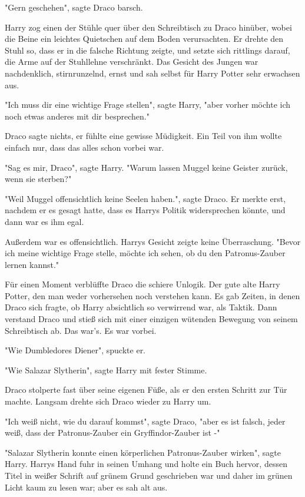 {"Gern geschehen", sagte Draco barsch.

Harry zog einen der Stühle quer über den Schreibtisch zu Draco hinüber, wobei die Beine ein leichtes Quietschen auf dem Boden verursachten. Er drehte den Stuhl so, dass er in die falsche Richtung zeigte, und setzte sich rittlings darauf, die Arme auf der Stuhllehne verschränkt. Das Gesicht des Jungen war nachdenklich, stirnrunzelnd, ernst und sah selbst für Harry Potter sehr erwachsen aus.

"Ich muss dir eine wichtige Frage stellen", sagte Harry, "aber vorher möchte ich noch etwas anderes mit dir besprechen."

Draco sagte nichts, er fühlte eine gewisse Müdigkeit. Ein Teil von ihm wollte einfach nur, dass das alles schon vorbei war.

"Sag es mir, Draco", sagte Harry. "Warum lassen Muggel keine Geister zurück, wenn sie sterben?"

"Weil Muggel offensichtlich keine Seelen haben.", sagte Draco. Er merkte erst, nachdem er es gesagt hatte, dass es Harrys Politik widersprechen könnte, und dann war es ihm egal.

Außerdem war es offensichtlich. Harrys Gesicht zeigte keine Überraschung. "Bevor ich meine wichtige Frage stelle, möchte ich sehen, ob du den Patronus-Zauber lernen kannst."

Für einen Moment verblüffte Draco die schiere Unlogik. Der gute alte Harry Potter, den man weder vorhersehen noch verstehen kann. Es gab Zeiten, in denen Draco sich fragte, ob Harry absichtlich so verwirrend war, als Taktik. Dann verstand Draco und stieß sich mit einer einzigen wütenden Bewegung von seinem Schreibtisch ab. Das war's. Es war vorbei.

"Wie Dumbledores Diener", spuckte er.

"Wie Salazar Slytherin", sagte Harry mit fester Stimme.

Draco stolperte fast über seine eigenen Füße, als er den ersten Schritt zur Tür machte. Langsam drehte sich Draco wieder zu Harry um.

"Ich weiß nicht, wie du darauf kommst", sagte Draco, "aber es ist falsch, jeder weiß, dass der Patronus-Zauber ein Gryffindor-Zauber ist -"

"Salazar Slytherin konnte einen körperlichen Patronus-Zauber wirken", sagte Harry. Harrys Hand fuhr in seinen Umhang und holte ein Buch hervor, dessen Titel in weißer Schrift auf grünem Grund geschrieben war und daher im grünen Licht kaum zu lesen war; aber es sah alt aus.

}
